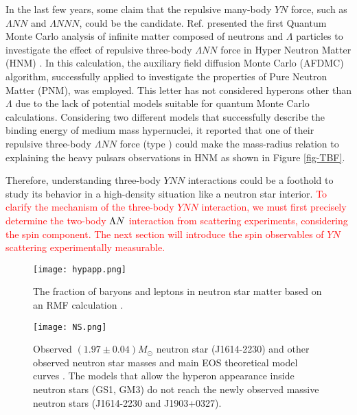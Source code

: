 In the last few years, some claim that the repulsive many-body $YN$ force, such as $\Lambda NN$ and $\Lambda NNN$, could be the candidate. Ref. \cite{Schmidt-1999} presented the first Quantum Monte Carlo analysis of infinite matter composed of neutrons and $\Lambda$ particles to investigate the effect of repulsive three-body $\Lambda NN$ force in Hyper Neutron Matter (HNM) \cite{Diego-2015}. In this calculation, the auxiliary field diffusion Monte Carlo (AFDMC) algorithm, successfully applied to investigate the properties of Pure Neutron Matter (PNM), was employed. This letter has not considered hyperons other than $\Lambda$ due to the lack of potential models suitable for quantum Monte Carlo calculations. Considering two different models that successfully describe the binding energy of medium mass hypernuclei, it reported that one of their repulsive three-body $\Lambda NN$ force (type ) could make the mass-radius relation to explaining the heavy pulsars observations in HNM as shown in Figure \ref{fig-TBF}.

Therefore, understanding three-body $YNN$ interactions could be a foothold to study its behavior in a high-density situation like a neutron star interior. \textcolor{red}{To clarify the mechanism of the three-body $YNN$ interaction, we must first precisely determine the two-body $\Lambda N$ interaction from scattering experiments, considering the spin component. The next section will introduce the spin observables of $YN$ scattering experimentally measurable.}

\begin{figure}[h]
  \begin{center}
   \texttt{[image: hypapp.png]}
   \caption{The fraction of baryons and leptons in neutron star matter based on an RMF calculation \cite{RMF-2008}.}
   \label{fig-hypapp}
 \end{center}
\end{figure}

\begin{figure}[h]
  \begin{center}
   \texttt{[image: NS.png]}
   \caption{Observed $(1.97\pm0.04)M_{\odot}$ neutron star (J1614-2230) and other observed neutron star masses and main EOS theoretical model curves \cite{NS-1}. The models that allow the hyperon appearance inside neutron stars (GS1, GM3) do not reach the newly observed massive neutron stars (J1614-2230 and J1903+0327).}
   \label{fig-NS}
 \end{center}
\end{figure}

